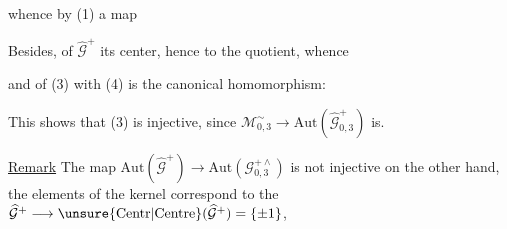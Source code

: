 whence by (1) a map


Besides,   of $\widehat{\mathcal{G}}^{+}$ 
its center, hence  to the quotient, whence


and  of (3) with (4) is the canonical
homomorphism:


This shows that (3) is injective, since
$\mathcal{M}_{0,3}^{\sim}\longrightarrow\mathrm{Aut}(\widehat{\mathcal{G}}_{0,3}^{+})$
is. 

\uline{Remark} The map
$\mathrm{Aut}(\widehat{\mathcal{G}}^{+})\longrightarrow\mathrm{Aut}(\mathcal{G}_{0,3}^{+\wedge})$
is not injective on the other hand,  the
elements of the kernel correspond to the
$\widehat{\mathcal{G}}^{+}\longrightarrow\unsure{\mathrm{Centr}|\mathrm{Centre}}(\widehat{\mathcal{G}}^{+})=\{\pm1\}$,



